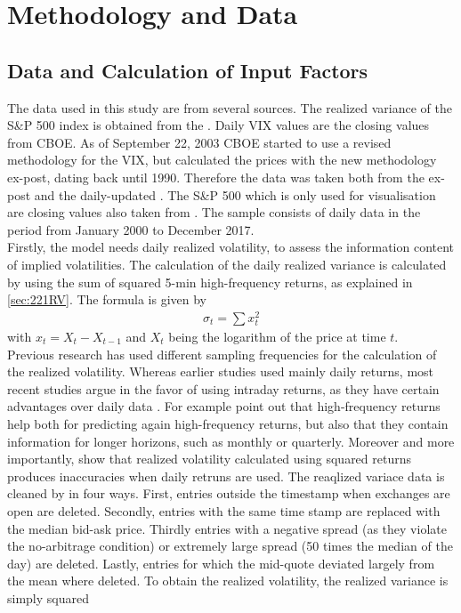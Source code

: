 
\section{Methodology and Data}\label{sec:4MethodData}

\subsection{Data and Calculation of Input Factors}\label{sec:41Data}
The data used in this study are from several sources. The realized variance of the S\&P 500 index is obtained from the \textcite{Oxford:RV}. Daily VIX values are the closing values from \gls{CBOE}. As of September 22, 2003 \gls{CBOE} started to use a revised methodology for the VIX, but calculated the prices with the new methodology ex-post, dating back until 1990. Therefore the data was taken both from the ex-post \textcite{CBOE:old} and the daily-updated \textcite{CBOE:new}. The S\&P 500 which is only used for visualisation are closing values also taken from \textcite{SandP}. The sample consists of daily data in the period from January 2000 to December 2017. \\
Firstly, the model needs daily realized volatility, to assess the information content of implied volatilities. The calculation of the daily realized variance is calculated by \textcite{Oxford:RV} using the sum of squared 5-min high-frequency returns, as explained in \ref{sec:221RV}. The formula is given by 
\begin{align}
\sigma_{t} = \sum x_{t}^{2}
\end{align}
with $x_{t} = X_{t} - X_{t-1}$ and $X_{t}$ being the logarithm of the price at time $t$. \\%
Previous research has used different sampling frequencies for the calculation of the realized volatility. Whereas earlier studies used mainly daily returns, most recent studies argue in the favor of using intraday returns, as they have certain advantages over daily data \parencite{jiang2003}. For example \textcite{andersen2003} point out that high-frequency returns help both for predicting again high-frequency returns, but also that they contain information for longer horizons, such as monthly or quarterly. Moreover and more importantly, \textcite{andersen1998} show that realized volatility calculated using squared returns produces inaccuracies when daily retruns are used. The reaqlized variace data is cleaned by \textcite{Oxford:RV} in four ways. First, entries outside the timestamp when exchanges are open are deleted. Secondly, entries with the same time stamp are replaced with the median bid-ask price. Thirdly entries with a negative spread (as they violate the no-arbitrage condition) or extremely large spread (50 times the median of the day) are deleted. Lastly, entries for which the mid-quote deviated largely from the mean where deleted. To obtain the realized volatility, the realized variance is simply squared
